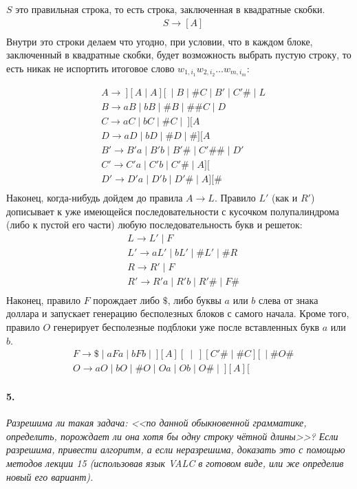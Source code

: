 \documentclass[russian,table]{article}
\begin{document}
$S$ это правильная строка, то есть строка, заключенная в квадратные скобки. 
\begin{align*}
    & S \to [A] \\
\end{align*}
Внутри это строки делаем что угодно, при условии, что в каждом блоке, заключенный в квадратные скобки, будет возможность выбрать пустую строку, то есть никак не испортить итоговое слово $w_{1,i_1} w_{2,i_2} \ldots w_{m,i_m}$:

\begin{align*}
    & A \to~][A \mid A][~\mid B \mid \#C \mid B' \mid C'\# \mid L \\
    & B \to aB \mid bB \mid \#B \mid \#\#C \mid D \\
    & C \to aC \mid bC \mid \#C \mid~][A \\
    & D \to aD \mid bD \mid \#D \mid \#][A \\
    & B' \to B'a \mid B'b \mid B'\# \mid C'\#\# \mid D' \\
    & C' \to C'a \mid C'b \mid C'\# \mid A][ \\
    & D' \to D'a \mid D'b \mid D'\# \mid A][\# \\
\end{align*}
Наконец, когда-нибудь дойдем до правила $A \to L$. Правило $L'$ (как и $R'$) дописывает к уже имеющейся последовательности с кусочком полупалиндрома (либо к пустой его части) любую последовательность букв и решеток:
\begin{align*}
    & L \to L' \mid F \\
    & L' \to aL' \mid bL' \mid \#L' \mid \#R \\
    & R \to R' \mid F \\
    & R' \to R'a \mid R'b \mid R'\# \mid F\# \\
\end{align*}
Наконец, правило $F$ порождает либо $\$$, либо буквы $a$ или $b$ слева от знака доллара и запускает генерацию бесполезных блоков с самого начала. Кроме того, правило $O$ генерирует бесполезные подблоки уже после вставленных букв $a$ или $b$.
\begin{align*}
    & F \to \$ \mid aFa \mid bFb \mid~][A][~\mid~][C'\# \mid \#C][~\mid \#O\# \\
    & O \to aO \mid bO \mid \#O \mid Oa \mid Ob \mid O\# \mid~][A][
\end{align*}

\paragraph*{5.} \textit{Разрешима ли такая задача: <<по данной обыкновенной грамматике, определить, порождает ли она хотя бы одну строку чётной длины>>? Если разрешима, привести алгоритм, а если неразрешима, доказать это с помощью методов лекции 15 (использовав язык VALC в готовом виде, или же определив новый его вариант).}
\end{document}
